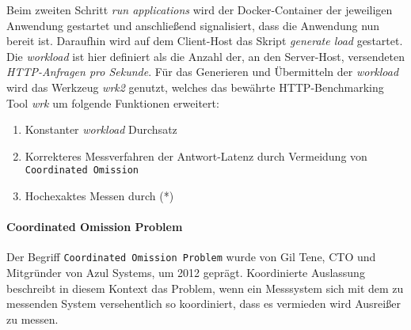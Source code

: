 Beim zweiten Schritt \textit{run applications} wird der Docker-Container der jeweiligen Anwendung gestartet und anschließend signalisiert,
dass die Anwendung nun bereit ist.
Daraufhin wird auf dem Client-Host das Skript \textit{generate load} gestartet.
Die \textit{workload} ist hier definiert als die Anzahl der, an den Server-Host, versendeten \textit{HTTP-Anfragen pro Sekunde}.
Für das Generieren und Übermitteln der \textit{workload} wird das Werkzeug \textit{wrk2} genutzt, welches das
bewährte HTTP-Benchmarking Tool \textit{wrk} um folgende Funktionen erweitert:
\begin{enumerate}
    \item Konstanter \textit{workload} Durchsatz
    \item Korrekteres Messverfahren der Antwort-Latenz durch Vermeidung von \verb|Coordinated Omission|
    \item Hochexaktes Messen durch (*)
\end{enumerate}\parencite{Wrk2, Wrk}

\paragraph{Coordinated Omission Problem}
Der Begriff \verb|Coordinated Omission Problem| wurde von Gil Tene, CTO und Mitgründer von Azul Systems, um 2012 geprägt.
Koordinierte Auslassung beschreibt in diesem Kontext das Problem, wenn ein Messsystem sich mit dem zu messenden System versehentlich so koordiniert,
dass es vermieden wird Ausreißer zu messen.


